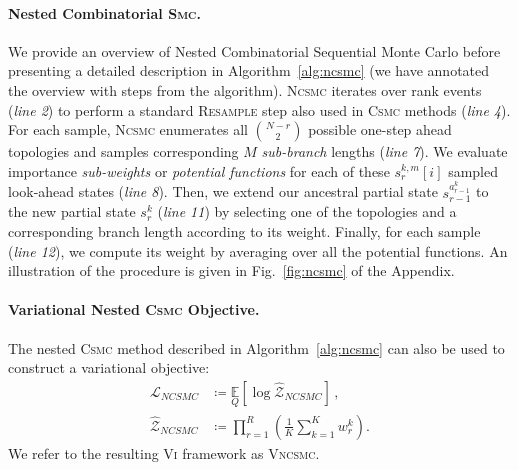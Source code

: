 \documentclass[accepted]{uai2021} %
\theoremstyle{definition}
\begin{document}
\paragraph{Nested Combinatorial \textsc{Smc}.}
We provide an overview of Nested Combinatorial Sequential Monte Carlo before presenting a detailed description in Algorithm~\ref{alg:ncsmc}  (we have annotated the overview with steps from the algorithm). \textsc{Ncsmc} iterates over rank events (\textit{line 2}) to perform a standard \textsc{Resample} step also used in \textsc{Csmc} methods (\textit{line 4}). For each sample, \textsc{Ncsmc} enumerates all ${N -r \choose 2}$ possible one-step ahead topologies and samples corresponding  $M$ \textit{sub-branch} lengths (\textit{line 7}). 
We evaluate importance \textit{sub-weights} or \textit{potential functions} for each of these $s_{r}^{k,m}[i]$ sampled look-ahead states (\textit{line 8}). Then, we extend our ancestral partial state $s_{r-1}^{a_{r-1}^k}$ to the new partial state $s_r^k$ (\textit{line 11}) by selecting one of the topologies and a corresponding branch length according to its weight.
Finally, for each sample (\textit{line 12}), we compute its weight by averaging over all the potential functions. An illustration of the procedure is given in Fig.~\ref{fig:ncsmc} of the Appendix.




\paragraph{Variational Nested \textsc{Csmc} Objective.} 
The nested \textsc{Csmc} method described in Algorithm~\ref{alg:ncsmc} can also be used to construct a variational objective:%
\begin{align}
    \mathcal{L}_{NCSMC} &
     \coloneqq \underset{Q}{\mathbb{E}}\left[\log \hat{ \mathcal{Z}}_{NCSMC} \right]\,,\\ %
      \widehat{\mathcal{Z}}_{NCSMC} &
      \coloneqq %
      \prod\limits_{r=1}^{R}\left(\frac{1}{K} \sum\limits_{k=1}^{K}w_{r}^k\right).
\end{align}
We refer to the resulting \textsc{Vi} framework as \textsc{Vncsmc}.
\end{document}
